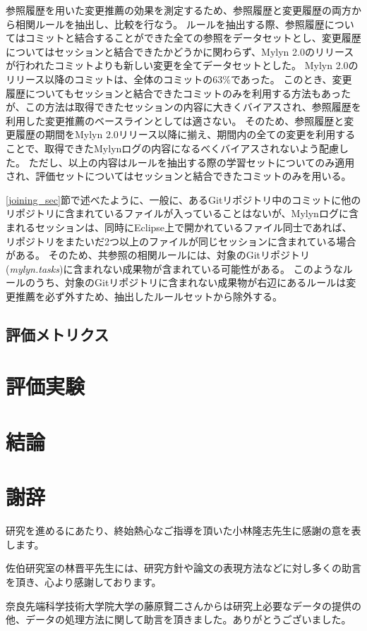 \documentclass[a4paper]{jsbook}
\begin{document}
参照履歴を用いた変更推薦の効果を測定するため、参照履歴と変更履歴の両方から相関ルールを抽出し、比較を行なう。
ルールを抽出する際、参照履歴についてはコミットと結合することができた全ての参照をデータセットとし、変更履歴についてはセッションと結合できたかどうかに関わらず、Mylyn 2.0のリリースが行われたコミットよりも新しい変更を全てデータセットとした。
Mylyn 2.0のリリース以降のコミットは、全体のコミットの63\%であった。
このとき、変更履歴についてもセッションと結合できたコミットのみを利用する方法もあったが、この方法は取得できたセッションの内容に大きくバイアスされ、参照履歴を利用した変更推薦のベースラインとしては適さない。
そのため、参照履歴と変更履歴の期間をMylyn 2.0リリース以降に揃え、期間内の全ての変更を利用することで、取得できたMylynログの内容になるべくバイアスされないよう配慮した。
ただし、以上の内容はルールを抽出する際の学習セットについてのみ適用され、評価セットについてはセッションと結合できたコミットのみを用いる。

\ref{joining_sec}節で述べたように、一般に、あるGitリポジトリ中のコミットに他のリポジトリに含まれているファイルが入っていることはないが、Mylynログに含まれるセッションは、同時にEclipse上で開かれているファイル同士であれば、リポジトリをまたいだ2つ以上のファイルが同じセッションに含まれている場合がある。
そのため、共参照の相関ルールには、対象のGitリポジトリ({\it mylyn.tasks})に含まれない成果物が含まれている可能性がある。
このようなルールのうち、対象のGitリポジトリに含まれない成果物が右辺にあるルールは変更推薦を必ず外すため、抽出したルールセットから除外する。

\section{評価メトリクス}\label{metrics_sec}
\chapter{評価実験}
\chapter{結論}
\chapter*{謝辞}
研究を進めるにあたり、終始熱心なご指導を頂いた小林隆志先生に感謝の意を表します。

佐伯研究室の林晋平先生には、研究方針や論文の表現方法などに対し多くの助言を頂き、心より感謝しております。

奈良先端科学技術大学院大学の藤原賢二さんからは研究上必要なデータの提供の他、データの処理方法に関して助言を頂きました。ありがとうございました。
\end{document}
